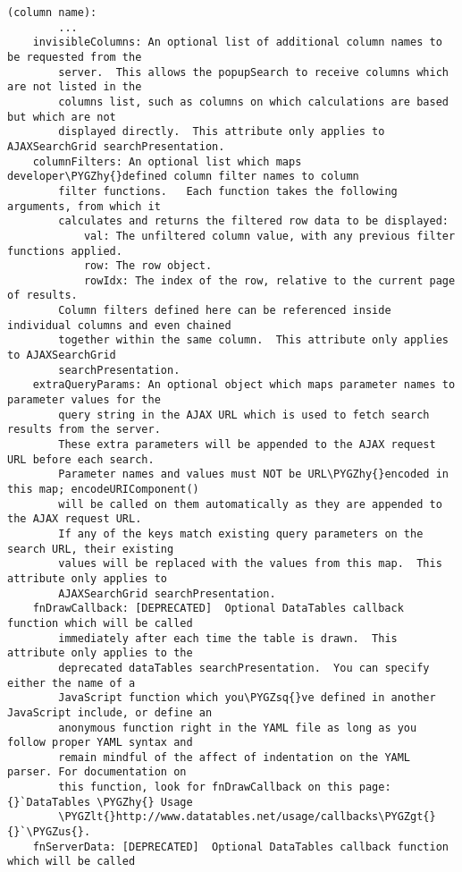 \documentclass[letterpaper,10pt,english]{sphinxmanual}
\def\PYGZus{\char`\_}
\def\PYGZlt{\char`\<}
\def\PYGZgt{\char`\>}
\def\PYGZhy{\char`\-}
\def\PYGZsq{\char`\'}
\renewcommand\PYGZsq{\textquotesingle}
\begin{document}
\begin{Verbatim}[commandchars=\\\{\}]
      (column name):
        ...
    invisibleColumns: An optional list of additional column names to be requested from the
        server.  This allows the popupSearch to receive columns which are not listed in the
        columns list, such as columns on which calculations are based but which are not
        displayed directly.  This attribute only applies to AJAXSearchGrid searchPresentation.
    columnFilters: An optional list which maps developer\PYGZhy{}defined column filter names to column
        filter functions.   Each function takes the following arguments, from which it
        calculates and returns the filtered row data to be displayed:
            val: The unfiltered column value, with any previous filter functions applied.
            row: The row object.
            rowIdx: The index of the row, relative to the current page of results.
        Column filters defined here can be referenced inside individual columns and even chained
        together within the same column.  This attribute only applies to AJAXSearchGrid
        searchPresentation.
    extraQueryParams: An optional object which maps parameter names to parameter values for the
        query string in the AJAX URL which is used to fetch search results from the server.
        These extra parameters will be appended to the AJAX request URL before each search.
        Parameter names and values must NOT be URL\PYGZhy{}encoded in this map; encodeURIComponent()
        will be called on them automatically as they are appended to the AJAX request URL.
        If any of the keys match existing query parameters on the search URL, their existing
        values will be replaced with the values from this map.  This attribute only applies to
        AJAXSearchGrid searchPresentation.
    fnDrawCallback: [DEPRECATED]  Optional DataTables callback function which will be called
        immediately after each time the table is drawn.  This attribute only applies to the
        deprecated dataTables searchPresentation.  You can specify either the name of a
        JavaScript function which you\PYGZsq{}ve defined in another JavaScript include, or define an
        anonymous function right in the YAML file as long as you follow proper YAML syntax and
        remain mindful of the affect of indentation on the YAML parser. For documentation on
        this function, look for fnDrawCallback on this page: {}`DataTables \PYGZhy{} Usage
        \PYGZlt{}http://www.datatables.net/usage/callbacks\PYGZgt{}{}`\PYGZus{}.
    fnServerData: [DEPRECATED]  Optional DataTables callback function which will be called

\end{Verbatim}
\end{document}
